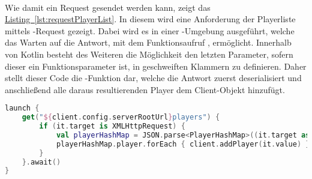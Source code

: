 \\
Wie damit ein Request gesendet werden kann, zeigt das \hyperref[lst:requestPlayerList]{Listing~\ref{lst:requestPlayerList}}. In diesem wird eine Anforderung der Playerliste mittels -Request gezeigt. Dabei wird es in einer -Umgebung ausgeführt, welche das Warten auf die Antwort, mit dem Funktionsaufruf , ermöglicht. Innerhalb von Kotlin besteht des Weiteren die Möglichkeit den letzten Parameter, sofern dieser ein Funktionsparameter ist, in geschweiften Klammern zu definieren. Daher stellt dieser Code die -Funktion dar, welche die Antwort zuerst deserialisiert und anschließend alle daraus resultierenden Player dem Client-Objekt hinzufügt.
\begin{lstlisting}[style=lstStyleFramed, language=Kotlin, caption={Funktionsaufruf eines \code{GET}-Requests am Beispiel der Playerliste}, label=lst:requestPlayerList, float]
launch {
	get("${client.config.serverRootUrl}players") {
		if (it.target is XMLHttpRequest) {
			val playerHashMap = JSON.parse<PlayerHashMap>((it.target as XMLHttpRequest).responseText)
			playerHashMap.player.forEach { client.addPlayer(it.value) }
		}
	}.await()
}
\end{lstlisting}

